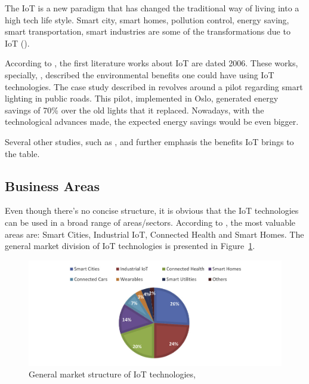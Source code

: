 The \gls{IoT} is a new paradigm that has changed the traditional way of living into a high tech life style. Smart city, smart homes, pollution control, energy saving, smart transportation, smart industries are some of the transformations due to \gls{IoT} (\cite{iot-intro}).

According to \cite{iot-history}, the first literature works about \gls{IoT} are dated 2006. These works, specially, \cite{1581336}, described the environmental benefits one could have using \gls{IoT} technologies.
The case study described in \cite{1581336} revolves around a pilot regarding smart lighting in public roads.
This pilot, implemented in Oslo, generated energy savings of 70\% over the old lights that it replaced.
Nowadays, with the technological advances made, the expected energy savings would be even bigger.

Several other studies, such as \cite{iot-santander}, \cite{iot-barcelona} and \cite{iot-water} further emphasis the benefits \gls{IoT} brings to the table.

\subsection{Business Areas}
\label{subsec:stateofart:iot:areas}

Even though there's no concise structure, it is obvious that the \gls{IoT} technologies can be used in a broad range of areas/sectors. According to \cite{nivzetic2019smart}, the most valuable areas are: Smart Cities, Industrial \gls{IoT}, Connected Health and Smart Homes. The general market division of IoT technologies is presented in Figure~\ref{fig:iot-areas}.

\begin{figure}[H]
    \centering
    \includegraphics[scale=0.5]{
        assets/figures/iot-areas.png
    }
    \caption[IoT market structure]{General market structure of IoT technologies, \cite{nivzetic2019smart}}
    \label{fig:iot-areas}
\end{figure}

